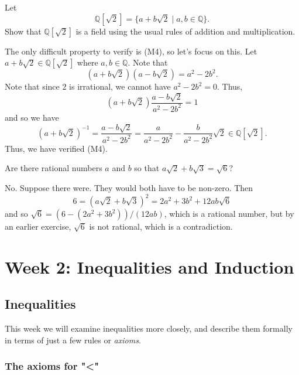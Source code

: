 \documentclass[11pt,dvipsnames]{book}
\numberwithin{figure}{section} %
\numberwithin{table}{section} %
\begin{document}
\begin{exercise}
Let
\[
\mathbb{Q}[\sqrt{2}] = \{a+b\sqrt{2}\; |\; a,b\in\mathbb{Q}\}.
\]
Show that $\mathbb{Q}[\sqrt{2}] $ is a field using the usual rules of addition and multiplication.
\end{exercise}

\begin{solution}
The only difficult property to verify is (M4), so let's focus on this. Let $a+b\sqrt{2}\in \mathbb{Q}[\sqrt{2}]$ where $a,b\in\mathbb{Q}$. Note that
\[
(a+b\sqrt{2})(a-b\sqrt{2})=a^2-2b^2.
\]
Note that since $2$ is irrational, we cannot have $a^2-2b^2=0$. Thus,
\[
(a+b\sqrt{2}) \frac{a-b\sqrt{2}}{a^2-2b^2}=1
\]
and so we have
\[
(a+b\sqrt{2})^{-1}
=\frac{a-b\sqrt{2}}{a^2-2b^2}
=\frac{a}{a^2-2b^2}-\frac{b}{a^2-2b^2}\sqrt{2} \in\mathbb{Q}[\sqrt{2}].\]
Thus, we have verified (M4).
\end{solution}

\begin{exercise}
Are there rational numbers $a$ and $b$ so that $a\sqrt{2}+b\sqrt{3}=\sqrt{6}$?
\begin{solution}
No. Suppose there were. They would both have to be non-zero. Then
\[
6=(a\sqrt{2}+b\sqrt{3})^2=2a^2+3b^2+12ab\sqrt{6}
\]
and so $\sqrt{6} = (6-(2a^2+3b^2))/(12ab)$, which is a rational number, but by an earlier exercise, $\sqrt{6}$ is not rational, which is a contradiction.
\end{solution}
\end{exercise}


\part{Week 2: Inequalities and Induction}

\chapter{Inequalities}

This week we will examine inequalities more closely, and describe them formally in terms of just a few rules or {\it axioms}.

\section{The axioms for "<"}
\end{document}
